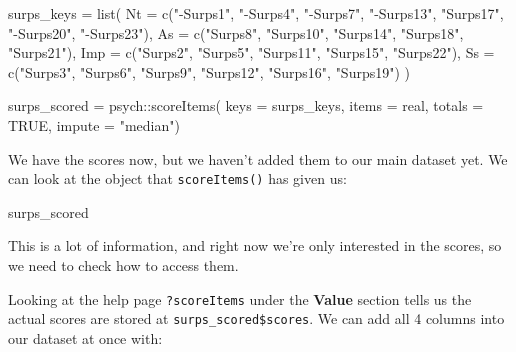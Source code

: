 \documentclass[
]{book}
\newenvironment{Shaded}{\begin{snugshade}}{\end{snugshade}}
\newcommand{\AttributeTok}[1]{\textcolor[rgb]{0.77,0.63,0.00}{#1}}
\newcommand{\ConstantTok}[1]{\textcolor[rgb]{0.00,0.00,0.00}{#1}}
\newcommand{\FunctionTok}[1]{\textcolor[rgb]{0.00,0.00,0.00}{#1}}
\newcommand{\NormalTok}[1]{#1}
\newcommand{\OtherTok}[1]{\textcolor[rgb]{0.56,0.35,0.01}{#1}}
\newcommand{\SpecialCharTok}[1]{\textcolor[rgb]{0.00,0.00,0.00}{#1}}
\newcommand{\StringTok}[1]{\textcolor[rgb]{0.31,0.60,0.02}{#1}}
\begin{document}
\begin{Shaded}
\begin{Highlighting}[]
\NormalTok{surps\_keys }\OtherTok{=} \FunctionTok{list}\NormalTok{(}
    \AttributeTok{Nt =} \FunctionTok{c}\NormalTok{(}\StringTok{"{-}Surps1"}\NormalTok{, }\StringTok{"{-}Surps4"}\NormalTok{, }\StringTok{"{-}Surps7"}\NormalTok{, }\StringTok{"{-}Surps13"}\NormalTok{, }
           \StringTok{"Surps17"}\NormalTok{, }\StringTok{"{-}Surps20"}\NormalTok{, }\StringTok{"{-}Surps23"}\NormalTok{),}
    \AttributeTok{As =} \FunctionTok{c}\NormalTok{(}\StringTok{"Surps8"}\NormalTok{, }\StringTok{"Surps10"}\NormalTok{, }\StringTok{"Surps14"}\NormalTok{, }\StringTok{"Surps18"}\NormalTok{, }
           \StringTok{"Surps21"}\NormalTok{),}
    \AttributeTok{Imp =} \FunctionTok{c}\NormalTok{(}\StringTok{"Surps2"}\NormalTok{, }\StringTok{"Surps5"}\NormalTok{, }\StringTok{"Surps11"}\NormalTok{, }\StringTok{"Surps15"}\NormalTok{, }
            \StringTok{"Surps22"}\NormalTok{),}
    \AttributeTok{Ss =} \FunctionTok{c}\NormalTok{(}\StringTok{"Surps3"}\NormalTok{, }\StringTok{"Surps6"}\NormalTok{, }\StringTok{"Surps9"}\NormalTok{, }\StringTok{"Surps12"}\NormalTok{, }
               \StringTok{"Surps16"}\NormalTok{, }\StringTok{"Surps19"}\NormalTok{)}
\NormalTok{)}

\NormalTok{surps\_scored }\OtherTok{=}\NormalTok{ psych}\SpecialCharTok{::}\FunctionTok{scoreItems}\NormalTok{(}
    \AttributeTok{keys =}\NormalTok{ surps\_keys, }
    \AttributeTok{items =}\NormalTok{ real,}
    \AttributeTok{totals =} \ConstantTok{TRUE}\NormalTok{,}
    \AttributeTok{impute =} \StringTok{"median"}\NormalTok{)}
\end{Highlighting}
\end{Shaded}

We have the scores now, but we haven't added them to our main dataset yet.
We can look at the object that \texttt{scoreItems()} has given us:

\begin{Shaded}
\begin{Highlighting}[]
\NormalTok{surps\_scored}
\end{Highlighting}
\end{Shaded}

This is a lot of information, and right now we're only interested in the scores,
so we need to check how to access them.

Looking at the help page \texttt{?scoreItems} under the \textbf{Value} section tells us the
actual scores are stored at \texttt{surps\_scored\$scores}. We can add all 4 columns into
our dataset at once with:
\end{document}
